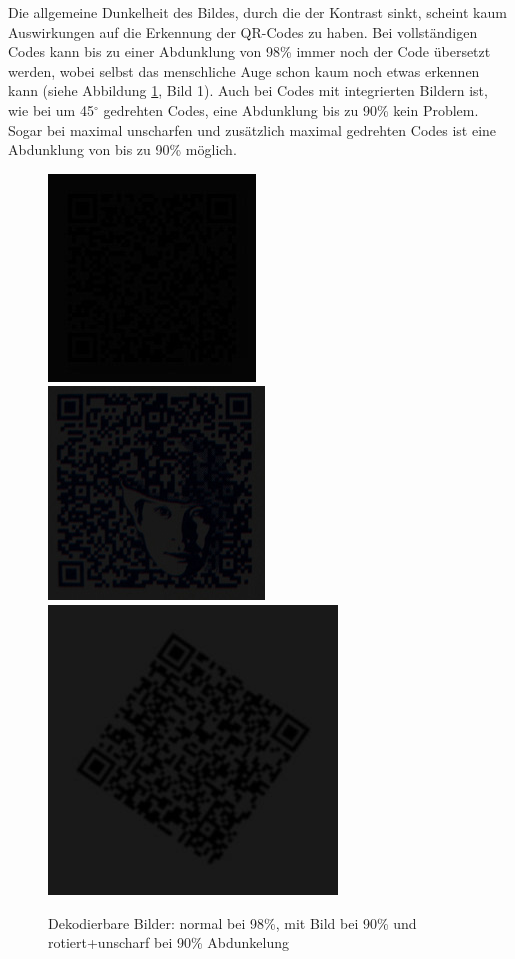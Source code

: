 Die allgemeine Dunkelheit des Bildes, durch die der Kontrast sinkt, scheint kaum Auswirkungen auf die Erkennung der QR-Codes zu haben. Bei vollständigen Codes kann bis zu einer Abdunklung von 98\% immer noch der Code übersetzt werden, wobei selbst das menschliche Auge schon kaum noch etwas erkennen kann (siehe Abbildung \ref*{fig:qrdark}, Bild 1). Auch bei Codes mit integrierten Bildern ist, wie bei um 45$ ^\circ $ gedrehten Codes, eine Abdunklung bis zu 90\% kein Problem. Sogar bei maximal unscharfen und zusätzlich maximal gedrehten Codes ist eine Abdunklung von bis zu 90\% möglich.
\begin{figure}[H]
  \centering
  \includegraphics[height=0.3\textwidth]{img/QR/dark_03_98.jpg}
  \includegraphics[height=0.3\textwidth]{img/QR/dark_04_90.jpg}
  \includegraphics[height=0.3\textwidth]{img/QR/blurrydarkrotate_03_3_90_35.jpg}
  \caption{Dekodierbare Bilder: normal bei 98\%, mit Bild bei 90\% und rotiert+unscharf bei 90\% Abdunkelung}
  \label{fig:qrdark}
\end{figure}

